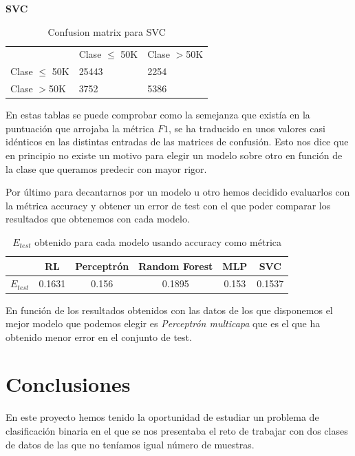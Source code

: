 \documentclass[11pt]{article}
\begin{document}
\textbf{SVC}
\begin{table}[H]
\centering
\begin{tabular}{lll}
                          &          Clase $\leq$ 50K        &       Clase $>$50K                \\ \cline{2-3} 
\multicolumn{1}{l|}{Clase $\leq$ 50K} & \multicolumn{1}{l|}{25443} & \multicolumn{1}{l|}{2254} \\ \cline{2-3} 
\multicolumn{1}{l|}{Clase $>$50K } & \multicolumn{1}{l|}{3752} & \multicolumn{1}{l|}{5386} \\ \cline{2-3} 
\end{tabular}
\caption{Confusion matrix para SVC}
\end{table}

En estas tablas se puede comprobar como la semejanza que existía en la
puntuación que arrojaba la métrica $F1$, se ha traducido en unos valores casi
idénticos en las distintas entradas de las matrices de confusión. Esto nos dice
que en principio no existe un motivo para elegir un modelo sobre otro en función
de la clase que queramos predecir con mayor rigor. 

Por último para decantarnos por un modelo u otro hemos decidido evaluarlos con
la métrica accuracy y obtener un error de test con el que poder comparar los
resultados que obtenemos con cada modelo.

\begin{table}[H]
    \centering
    \begin{tabular}{c|c|c|c|c|c|}
    \cline{2-6}
                           & RL & Perceptrón & Random Forest & MLP & SVC \\ \hline
    \multicolumn{1}{|l|}{$E_{test}$}  & 0.1631 & 0.156 & 0.1895  & 0.153  & 0.1537  \\ \hline
    \end{tabular}
    \caption{$E_{test}$ obtenido para cada modelo usando accuracy como métrica}
\end{table}

En función de los resultados obtenidos con las datos de los que disponemos el
mejor modelo que podemos elegir es \textit{Perceptrón multicapa} que es el que
ha obtenido menor error en el conjunto de test.

\section{Conclusiones}

En este proyecto hemos tenido la oportunidad de estudiar un problema de
clasificación binaria en el que se nos presentaba el reto de trabajar con 
dos clases de datos de las que no teníamos igual número de muestras. 
\end{document}
